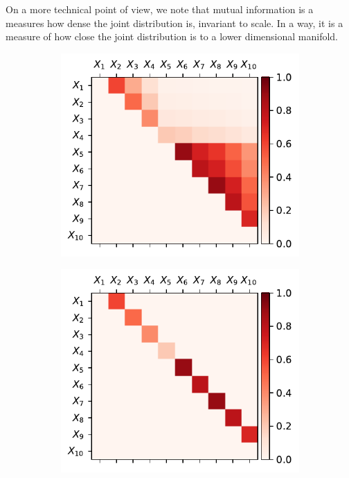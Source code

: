 \documentclass[../Thesis.tex]{subfiles}
\begin{document}
On a more technical point of view, we note that mutual information is a measures how dense the joint distribution is, invariant to scale. In a way, it is a measure of how close the joint distribution is to a lower dimensional manifold.


\begin{figure}[h]
    \centering
    \begin{subfigure}[t]{0.49\textwidth}
        \centering
        \includegraphics[width=\linewidth]{figures/Gaussian Chain Theoretical/triangular G obs.pdf}
        \caption{}
    \end{subfigure}
    \hfill
    \begin{subfigure}[t]{0.49\textwidth}
        \centering
        \includegraphics[width=\linewidth]{figures/Gaussian Chain Theoretical/G dir from triangular G obs.pdf}

\end{subfigure}
\end{figure}
\end{document}
